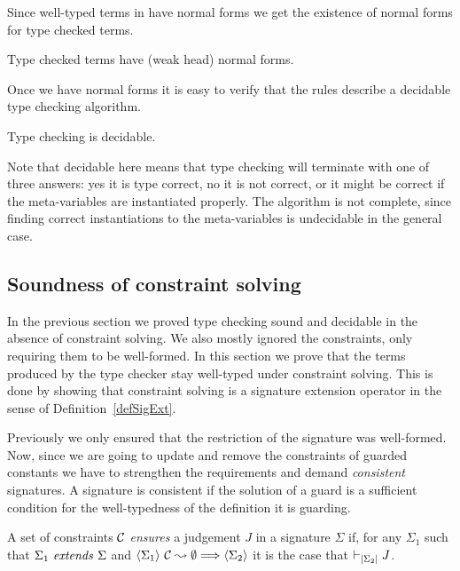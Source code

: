 Since well-typed terms in {\Core} have normal forms we get the existence of
normal forms for type checked terms.

\begin{corollary}
    Type checked terms have (weak head) normal forms.
\end{corollary}

Once we have normal forms it is easy to verify that the rules describe a
decidable type checking algorithm.

\begin{corollary}
    Type checking is decidable.
\end{corollary}

Note that decidable here means that type checking will terminate with one of
three answers: yes it is type correct, no it is not correct, or it might be
correct if the meta-variables are instantiated properly. The algorithm is not
complete, since finding correct instantiations to the meta-variables is
undecidable in the general case.

\subsection{Soundness of constraint solving}

In the previous section we proved type checking sound and decidable in the
absence of constraint solving. We also mostly ignored the constraints, only
requiring them to be well-formed. In this section we prove that the terms
produced by the type checker stay well-typed under constraint solving. This is
done by showing that constraint solving is a signature extension operator in
the sense of Definition~\ref{defSigExt}.

Previously we only ensured that the {\Core} restriction of the signature was
well-formed. Now, since we are going to update and remove the constraints of
guarded constants we have to strengthen the requirements and demand {\em
consistent} signatures. A signature is consistent if the solution of a guard is
a sufficient condition for the well-typedness of the definition it is guarding.

\begin{definition}[Ensures] \label{defEnsures}
    A set of constraints $\mathcal{C}$ {\em ensures} a {\Core} judgement $J$ in a signature
    $\Sigma$ if, for any $\Sigma_1$ such that
    ${\Sigma_1} ~ \mathit{extends} ~ {\Sigma}$ and
    $\langle {\Sigma_1} \rangle ~ {{\mathcal{C}} \leadsto {\emptyset}} \Longrightarrow \langle {\Sigma_2} \rangle$
    it is the case that $\vdash_{\left|{\Sigma_2}\right|} J$.
\end{definition}

